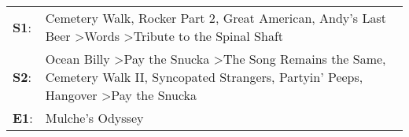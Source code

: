 \begin{supertabular}{p{0.03\textwidth}p{0.92\textwidth}}
 \textbf{S1}:  &                                                                                                          Cemetery Walk\textsuperscript{}, \enspace Rocker Part 2\textsuperscript{}, \enspace Great American\textsuperscript{}, \enspace Andy's Last Beer\textsuperscript{} \textgreater \enspace Words\textsuperscript{} \textgreater \enspace Tribute to the Spinal Shaft\textsuperscript{}  \enspace  \\
 \textbf{S2}:  &  Ocean Billy\textsuperscript{} \textgreater \enspace Pay the Snucka\textsuperscript{} \textgreater \enspace The Song Remains the Same\textsuperscript{}, \enspace Cemetery Walk II\textsuperscript{}, \enspace Syncopated Strangers\textsuperscript{}, \enspace Partyin' Peeps\textsuperscript{}, \enspace Hangover\textsuperscript{} \textgreater \enspace Pay the Snucka\textsuperscript{}  \enspace  \\
 \textbf{E1}:  &                                                                                                                                                                                                                                                                                                                                                           Mulche's Odyssey\textsuperscript{}  \enspace  \\
\end{supertabular}
